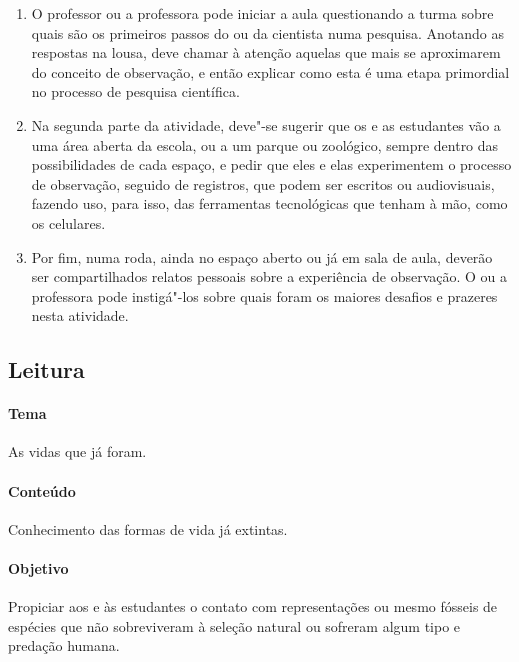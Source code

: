 \documentclass[11pt]{extarticle}
\begin{document}
\begin{enumerate}

	\item
	O professor ou a professora pode iniciar a aula questionando a turma sobre quais
	são os primeiros passos do ou da cientista numa pesquisa. Anotando as respostas
	na lousa, deve chamar à atenção aquelas que mais se aproximarem do conceito 
	de observação, e então explicar como esta é uma etapa primordial
	no processo de pesquisa científica.

	\item
	Na segunda parte da atividade, deve"-se sugerir que os e as estudantes vão 
	a uma área aberta da escola, ou a um parque ou zoológico, sempre dentro
	das possibilidades de cada espaço, e pedir que eles e elas experimentem
	o processo de observação, seguido de registros, que podem ser
	escritos ou audiovisuais, fazendo uso, para isso, das ferramentas tecnológicas
	que tenham à mão, como os celulares.

	\item
	Por fim, numa roda, ainda no espaço aberto ou já em sala de aula,
	deverão ser compartilhados relatos pessoais sobre a experiência de observação.
	O ou a professora pode instigá"-los sobre quais foram os maiores desafios e 
	prazeres nesta atividade.

\end{enumerate}







\subsection{Leitura}

\paragraph{Tema} As vidas que já foram.

\paragraph{Conteúdo} Conhecimento das formas de vida já extintas.

\paragraph{Objetivo} Propiciar aos e às estudantes o contato com representações
ou mesmo fósseis de espécies que não sobreviveram à seleção natural ou sofreram
algum tipo e predação humana. 
\end{document}
